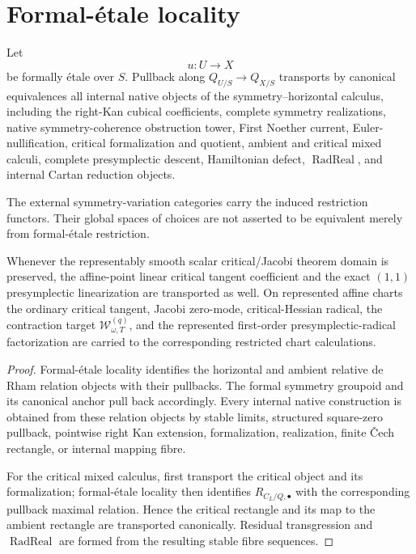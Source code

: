 \section{Formal-\'etale locality}
\label{sec:symmetry-noether-formal-etale-locality}

\begin{theorem}
\label{thm:symmetry-noether-formal-etale-locality-of-the-native-noether-geometry}
Let
\[
u:U\longrightarrow X
\]
be formally \'etale over $S$.  Pullback along $Q_{U/S}\to Q_{X/S}$ transports by
canonical equivalences all internal native objects of the symmetry--horizontal
calculus, including the right-Kan cubical coefficients, complete symmetry
realizations, native symmetry-coherence obstruction tower, First Noether current,
Euler-nullification, critical formalization and quotient, ambient and critical
mixed calculi, complete presymplectic descent, Hamiltonian defect,
$\operatorname{RadReal}$, and internal Cartan reduction objects.

The external symmetry-variation categories carry the induced restriction functors.
Their global spaces of choices are not asserted to be equivalent merely from
formal-\'etale restriction.

Whenever the representably smooth scalar critical/Jacobi theorem domain is
preserved, the affine-point linear critical tangent coefficient and the exact
$(1,1)$ presymplectic linearization are transported as well.  On represented affine
charts the ordinary critical tangent, Jacobi zero-mode, critical-Hessian radical,
the contraction target $\mathcal W_{\omega,T}^{(q)}$, and the represented
first-order presymplectic-radical factorization are carried to the corresponding
restricted chart calculations.
\end{theorem}

\begin{proof}
Formal-\'etale locality identifies the horizontal and ambient relative de Rham
relation objects with their pullbacks.  The formal symmetry groupoid and its
canonical anchor pull back accordingly.  Every internal native construction is
obtained from these relation objects by stable limits, structured square-zero
pullback, pointwise right Kan extension, formalization, realization, finite \v{C}ech rectangle, or
internal mapping fibre.

For the critical mixed calculus, first transport the critical object and its
formalization; formal-\'etale locality then identifies $R_{C_L/Q,\bullet}$ with the
corresponding pullback maximal relation.  Hence the critical rectangle and its map
to the ambient rectangle are transported canonically.  Residual transgression and
$\operatorname{RadReal}$ are formed from the resulting stable fibre sequences.
\end{proof}

